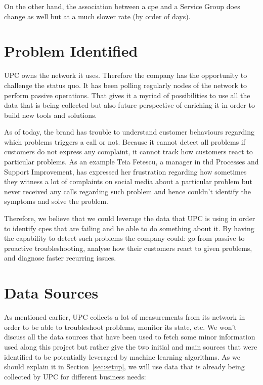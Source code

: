 On the other hand, the association between a \acrshort{cpe} and a Service Group does change as well but at a much slower rate (by order of days). 

\section{Problem Identified}
UPC owns the network it uses. Therefore the company has the opportunity to challenge the status quo. It has been polling regularly nodes of the network to perform passive operations. That gives it a myriad of possibilities to use all the data that is being collected but also future perspective of enriching it in order to build new tools and solutions.

As of today, the brand has trouble to understand customer behaviours regarding which problems triggers a call or not. Because it cannot detect all problems if customers do not express any complaint, it cannot track how customers react to particular problems. As an example Teia Fetescu, a manager in \acrfull{thd} Processes and Support Improvement, has expressed her frustration regarding how sometimes they witness a lot of complaints on social media about a particular problem but never received any calls regarding such problem and hence couldn't identify the symptoms and solve the problem. 

Therefore, we believe that we could leverage the data that UPC is using in order to identify \acrshort{cpe}s that are failing and be able to do something about it. By having the capability to detect such problems the company could: go from passive to proactive troubleshooting, analyse how their customers react to given problems, and diagnose faster recurring issues.

\section{Data Sources}
As mentioned earlier, UPC collects a lot of measurements from its network in order to be able to troubleshoot problems, monitor its state, etc. We won't discuss all the data sources that have been used to fetch some minor information used along this project but rather give the two initial and main sources that were identified to be potentially leveraged by machine learning algorithms. As we should explain it in Section~\ref{sec:setup}, we will use data that is already being collected by UPC for different business needs:

